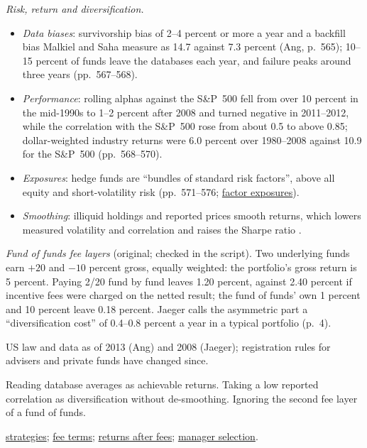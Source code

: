 \begin{qfdefinition}
\emph{Risk, return and diversification.}
\begin{itemize}
\item \emph{Data biases}: survivorship bias of 2--4 percent or more a year and a backfill bias Malkiel and Saha measure as 14.7 against 7.3 percent (Ang, p.~565); 10--15 percent of funds leave the databases each year, and failure peaks around three years (pp.~567--568).
\item \emph{Performance}: rolling alphas against the S\&P~500 fell from over 10 percent in the mid-1990s to 1--2 percent after 2008 and turned negative in 2011--2012, while the correlation with the S\&P~500 rose from about 0.5 to above 0.85; dollar-weighted industry returns were 6.0 percent over 1980--2008 against 10.9 for the S\&P~500 (pp.~568--570).
\item \emph{Exposures}: hedge funds are ``bundles of standard risk factors'', above all equity and short-volatility risk (pp.~571--576; \hyperref[meth:hedge-fund-factor-exposures]{factor exposures}).
\item \emph{Smoothing}: illiquid holdings and reported prices smooth returns, which lowers measured volatility and correlation and raises the Sharpe ratio \citep[pp.~21--23]{wide-getmansky-lo-makarov}.
\end{itemize}

 \emph{Fund of funds fee layers} (original; checked in the script). Two underlying funds earn $+20$ and $-10$ percent gross, equally weighted: the portfolio's gross return is 5 percent. Paying 2/20 fund by fund leaves 1.20 percent, against 2.40 percent if incentive fees were charged on the netted result; the fund of funds' own 1 percent and 10 percent leave 0.18 percent. Jaeger calls the asymmetric part a ``diversification cost'' of 0.4--0.8 percent a year in a typical portfolio (p.~4).

 US law and data as of 2013 (Ang) and 2008 (Jaeger); registration rules for advisers and private funds have changed since.

 Reading database averages as achievable returns. Taking a low reported correlation as diversification without de-smoothing. Ignoring the second fee layer of a fund of funds.

 \hyperref[meth:hedge-fund-strategy-classification]{strategies}; \hyperref[def:alternative-fund-terms]{fee terms}; \hyperref[meth:alternative-returns-after-fees]{returns after fees}; \hyperref[meth:manager-due-diligence]{manager selection}.

\end{qfdefinition}

